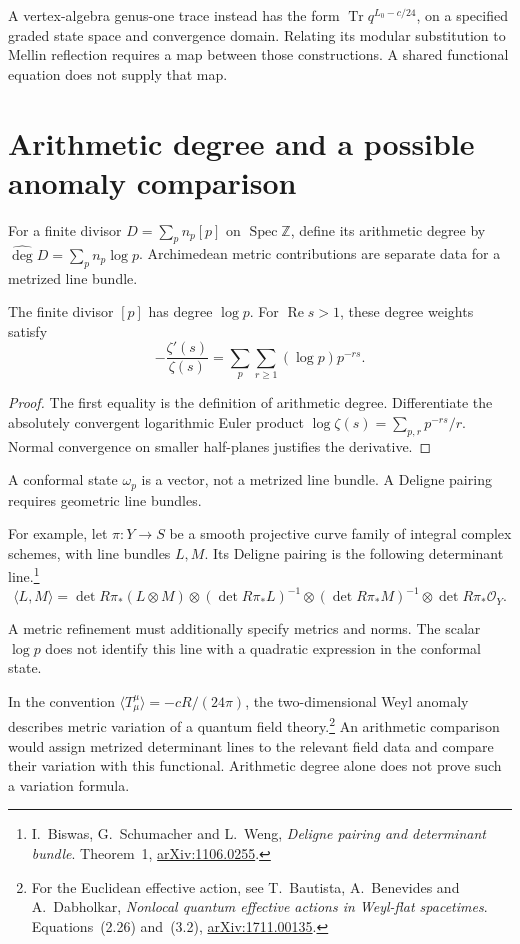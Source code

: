 A vertex-algebra genus-one trace instead has the form
\(\operatorname{Tr}q^{L_0-c/24}\), on a specified graded state
space and convergence domain. Relating its modular substitution
to Mellin reflection requires a map between those constructions.
A shared functional equation does not supply that map.

\section{Arithmetic degree and a possible anomaly comparison}
\label{v4-arith:pol:arakelov-pairing}

For a finite divisor \(D=\sum_pn_p[p]\) on
\(\operatorname{Spec}\mathbb Z\), define its arithmetic degree by
\(\widehat{\deg}D=\sum_p n_p\log p\).
Archimedean metric contributions are separate data for a
metrized line bundle.

\begin{proposition}\label{v4-arith:prop:deligne-pairing}
The finite divisor \([p]\) has degree \(\log p\).
For \(\operatorname{Re}s>1\), these degree weights satisfy
\[
                  -\frac{\zeta'(s)}{\zeta(s)}
                       =\sum_p\sum_{r\geq1}(\log p)p^{-rs}.
\]
\end{proposition}

\begin{proof}
The first equality is the definition of arithmetic degree.
Differentiate the absolutely convergent logarithmic Euler product
\(\log\zeta(s)=\sum_{p,r}p^{-rs}/r\).
Normal convergence on smaller half-planes justifies the derivative.
\end{proof}

A conformal state \(\omega_p\) is a vector, not a metrized
line bundle. A Deligne pairing requires geometric line bundles.

For example, let \(\pi:Y\to S\) be a smooth projective curve
family of integral complex schemes, with line bundles \(L,M\).
Its Deligne pairing is the following determinant line.\footnote{
I.~Biswas, G.~Schumacher and L.~Weng,
\emph{Deligne pairing and determinant bundle}. Theorem~1,
\href{https://arxiv.org/abs/1106.0255}{arXiv:1106.0255}.}
\[
 \langle L,M\rangle=
 \det R\pi_*(L\otimes M)\otimes(\det R\pi_*L)^{-1}
 \otimes(\det R\pi_*M)^{-1}\otimes\det R\pi_*\mathcal O_Y.
\]

A metric refinement must additionally specify metrics and norms.
The scalar \(\log p\) does not identify this line with a
quadratic expression in the conformal state.

\begin{remark}
In the convention \(\langle T^\mu_\mu\rangle=-cR/(24\pi)\),
the two-dimensional Weyl anomaly describes metric variation of
a quantum field theory.\footnote{For the Euclidean effective action,
see T.~Bautista, A.~Benevides and A.~Dabholkar,
\emph{Nonlocal quantum effective actions in Weyl-flat spacetimes}.
Equations~(2.26) and~(3.2),
\href{https://arxiv.org/abs/1711.00135}{arXiv:1711.00135}.}
An arithmetic comparison would assign
metrized determinant lines to the relevant field data and compare
their variation with this functional. Arithmetic degree alone
does not prove such a variation formula.
\end{remark}

